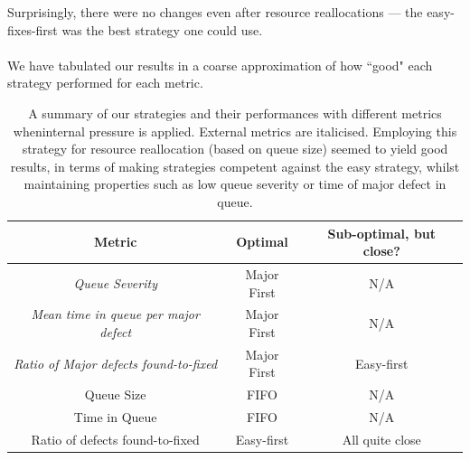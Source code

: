 Surprisingly, there were no changes even after resource reallocations --- the easy-fixes-first was
the best strategy one could use.\\
\\
We have tabulated our results in a coarse approximation of how ``good" each strategy performed for
each metric.

\begin{table}[ht!]
	\centering
	\begin{tabular}{|c|c|c|}
	\hline
	{\bf Metric} & {\bf Optimal} & {\bf Sub-optimal, but close?} \\ \hline
	{\em Queue Severity} & Major First & N/A \\ \hline
	{\em Mean time in queue per major defect} & Major First & N/A\\ \hline
	{\em Ratio of Major defects found-to-fixed} & Major First & Easy-first \\ \hline
	Queue Size & FIFO & N/A \\ \hline
	Time in Queue & FIFO & N/A \\ \hline
	Ratio of defects found-to-fixed & Easy-first & All quite close \\ \hline
	\end{tabular}
	\caption{A summary of our strategies and their performances with different
    metrics wheninternal 
pressure is applied.
External metrics are italicised.
Employing this strategy for resource reallocation (based on queue size) seemed to yield good results, in terms of making
strategies competent against the easy strategy, whilst maintaining properties such as low queue
severity or time of major defect in queue.}
	\label{summaryex}
\end{table}

